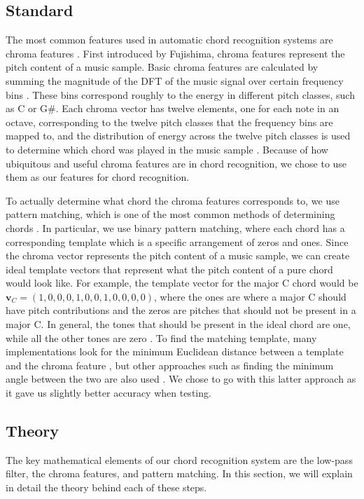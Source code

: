 \documentclass[journal]{IEEEtran}
\begin{document}
\subsection{Standard}
The most common features used in automatic chord recognition systems are chroma features \cite{cho_chroma}.
First introduced by Fujishima, chroma features represent the pitch content of a music sample.
Basic chroma features are calculated by summing the magnitude of the DFT of the music signal over certain frequency bins \cite{fujishima}.
These bins correspond roughly to the energy in different pitch classes, such as C or G\#.
Each chroma vector has twelve elements, one for each note in an octave, corresponding to the twelve pitch classes that the frequency bins are mapped to, and the distribution of energy across the twelve pitch classes is used to determine which chord was played in the music sample \cite{jiang}.
Because of how ubiquitous and useful chroma features are in chord recognition, we chose to use them as our features for chord recognition.

To actually determine what chord the chroma features corresponds to, we use pattern matching, which is one of the most common methods of determining chords \cite{cho_chroma}.
In particular, we use binary pattern matching, where each chord has a corresponding template which is a specific arrangement of zeros and ones.
Since the chroma vector represents the pitch content of a music sample, we can create ideal template vectors that represent what the pitch content of a pure chord would look like.
For example, the template vector for the major C chord would be $\mathbf{v}_C = (1, 0, 0, 0, 1, 0, 0, 1, 0, 0, 0, 0)$, where the ones are where a major C should have pitch contributions and the zeros are pitches that should not be present in a major C.
In general, the tones that should be present in the ideal chord are one, while all the other tones are zero \cite{cho_chroma}.
To find the matching template, many implementations look for the minimum Euclidean distance between a template and the chroma feature \cite{stark}, but other approaches such as finding the minimum angle between the two are also used \cite{jiang}.
We chose to go with this latter approach as it gave us slightly better accuracy when testing.


\subsection{Theory}
The key mathematical elements of our chord recognition system are the low-pass filter, the chroma features, and pattern matching.
In this section, we will explain in detail the theory behind each of these steps.
\end{document}
